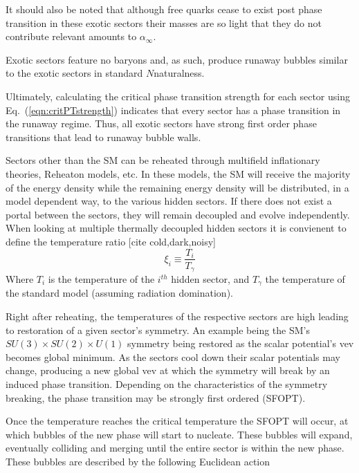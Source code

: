 \documentclass[nofootinbib,twocolumn,preprintnumbers]{revtex4-1}
\begin{document}
It should also be noted that although free quarks cease to exist post phase transition in these exotic sectors their masses are so light that they do not contribute relevant amounts to $\alpha_{\infty}$.

Exotic sectors feature no baryons and, as such, produce runaway bubbles similar to the exotic sectors in standard $N$naturalness.  

Ultimately, calculating the critical phase transition strength for each sector using Eq.~(\ref{eqn:critPTstrength}) indicates that every sector has a phase transition in the runaway regime. Thus, all exotic sectors have strong first order phase transitions that lead to runaway bubble walls.

\label{sec:gw}
Sectors other than the SM can be reheated through multifield inflationary theories, Reheaton models, etc. In these models, the SM will receive the majority of the energy density while the remaining energy density will be distributed, in a model dependent way, to the various hidden sectors. If there does not exist a portal between the sectors, they will remain decoupled and evolve independently. When looking at multiple thermally decoupled hidden sectors it is convienent to define the temperature ratio [cite cold,dark,noisy]
\begin{equation}
\xi_i \equiv  \frac{T_{i}}{T_{\gamma}}
\end{equation}
Where $T_{i}$ is the temperature of the $i^{th}$ hidden sector, and $T_{\gamma}$ the temperature of the standard model (assuming radiation domination).

\vspace{1em }
Right after reheating, the temperatures of the respective sectors are high leading to restoration of a given sector's symmetry.  An example being the SM's $SU(3) \times SU(2) \times U(1)$ symmetry being restored as the scalar potential's vev becomes global minimum. As the sectors cool down their scalar potentials may change, producing a new global vev at which the symmetry will break by an induced phase transition. Depending on the characteristics of the symmetry breaking, the phase transition may be strongly first ordered (SFOPT).  

Once the temperature reaches the critical temperature the SFOPT will occur, at which bubbles of the new phase will start to nucleate. These bubbles will expand, eventually colliding and merging until the entire sector is within the new phase.  These bubbles are described by the following Euclidean action
\end{document}
